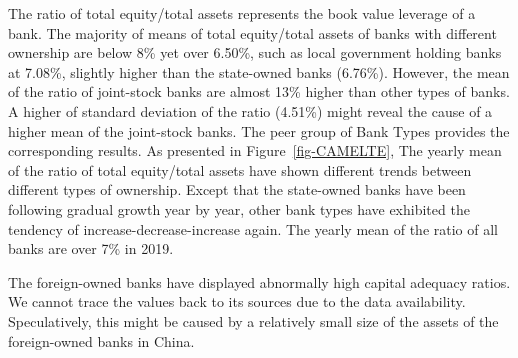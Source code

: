 \documentclass[
  12pt,
  a4paper,
]{scrreprt}
\begin{document}
{{{{The ratio of total equity/total assets represents the book value
leverage of a bank. The majority of means of total equity/total assets
of banks with different ownership are below 8\% yet over 6.50\%, such as
local government holding banks at 7.08\%, slightly higher than the
state-owned banks (6.76\%). However, the mean of the ratio of
joint-stock banks are almost 13\% higher than other types of banks. A
higher of standard deviation of the ratio (4.51\%) might reveal the
cause of a higher mean of the joint-stock banks. The peer group of Bank
Types provides the corresponding results. As presented in
Figure~\ref{fig-CAMELTE}, The yearly mean of the ratio of total
equity/total assets have shown different trends between different types
of ownership. Except that the state-owned banks have been following
gradual growth year by year, other bank types have exhibited the
tendency of increase-decrease-increase again. The yearly mean of the
ratio of all banks are over 7\% in 2019.

The foreign-owned banks have displayed abnormally high capital adequacy
ratios. We cannot trace the values back to its sources due to the data
availability. Speculatively, this might be caused by a relatively small
size of the assets of the foreign-owned banks in China.

\begin{figure}



\end{figure}}}}}
\end{document}
